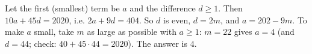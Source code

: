 Let the first (smallest) term be $a$ and the difference $d\ge1$. Then $10a+45d=2020$, i.e. $2a+9d=404$. So $d$ is even, $d=2m$, and $a=202-9m$. To make $a$ small, take $m$ as large as possible with $a\ge1$: $m=22$ gives $a=4$ (and $d=44$; check: $40+45\cdot44=2020$). The answer is $\boxed{4}$.
